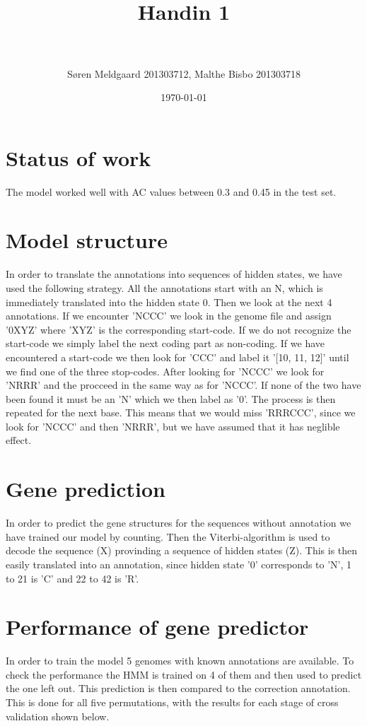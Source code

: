 \documentclass[paper=a4, fontsize=11pt]{scrartcl} %
\title{	
\normalfont \normalsize 
\horrule{0.5pt} \\[0.4cm] %
\huge Handin 1 \\ %
\horrule{2pt} \\[0.5cm] %
}
\author{S\o ren Meldgaard 201303712, Malthe Bisbo 201303718} %
\date{\normalsize\today} %
\numberwithin{equation}{section} %
\numberwithin{figure}{section} %
\numberwithin{table}{section} %
\begin{document}
\maketitle %

\section{Status of work}
The model worked well with AC values between 0.3 and 0.45 in the test set.
\section{Model structure}

In order to translate the annotations into sequences of hidden states, we have used the following strategy.
All the annotations start with an N, which is immediately translated into the hidden state 0. Then we look at the next 4 annotations. If we encounter 'NCCC' we look in the genome file and assign '0XYZ' where 'XYZ' is the corresponding start-code. If we do not recognize the start-code we simply label the next coding part as non-coding. If we have encountered a start-code we then look for 'CCC' and label it '[10, 11, 12]' until we find one of the three stop-codes. After looking for 'NCCC' we look for 'NRRR' and the procceed in the same way as for 'NCCC'. If none of the two have been found it must be an 'N' which we then label as '0'. The process is then repeated for the next base. This means that we would miss 'RRRCCC', since we look for 'NCCC' and then 'NRRR', but we have assumed that it has neglible effect.

\section{Gene prediction}
In order to predict the gene structures for the sequences without annotation we have trained our model by counting. Then the Viterbi-algorithm is used to decode the sequence (X) provinding a sequence of hidden states (Z). This is then easily translated into an annotation, since hidden state '0' corresponds to 'N', 1 to 21 is 'C' and 22 to 42 is 'R'.

\section{Performance of gene predictor}
In order to train the model 5 genomes with known annotations are available. To check the performance the HMM is trained on 4 of them and then used to predict the one left out. This prediction is then compared to the correction annotation. This is done for all five permutations, with the results for each stage of cross validation shown below. \\
\end{document}
